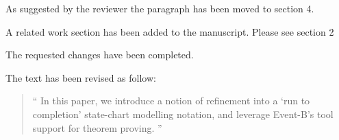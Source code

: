 \documentclass{response}
\begin{document}
\begin{comment}{Reviewer \#2}
  - In the introduction, the paragraph before last "Page 3: lines 7 to 17" that
  compares the proposed approach to the work presented in [4] may be pushed to
  Section 3 or 4 since such comparison is meaningless before presenting the
  details of the approach and the example.
\end{comment}

\begin{response}
  As suggested by the reviewer the paragraph has been moved to section 4. 
\end{response}


\begin{comment}{Reviewer \#2}
 - The paper lacks a related work section. Please add one.
\end{comment}

\begin{response}
A related work section has been added to the manuscript. Please see section 2
\end{response}



\begin{comment}{Reviewer \#2}
Minor points:
  - After an introductory word or phrase, use a comma (this is a recurrent in
  the paper). For example, e.g. --> e.g., i.e. --> i.e., "To verify liveness 
  we outline" --> "To verify liveness,  we outline", etc.
\end{comment}

\begin{response}
  The requested changes have been completed.
\end{response}


\begin{comment}{Reviewer \#2}
- Abstract: "We introduce" --> "In this paper, we introduce".
\end{comment}

\begin{response}
  The text has been revised as follow:
  \begin{quote}
    `` In this paper, we introduce a notion of refinement into a ‘run to completion’ state-chart 
    modelling notation, and leverage Event-B’s tool support for theorem proving. ''
  \end{quote}
\end{response}


\begin{comment}{Reviewer \#2}
- Add "Even-B" to the list of keywords.
\end{comment}
\end{document}

